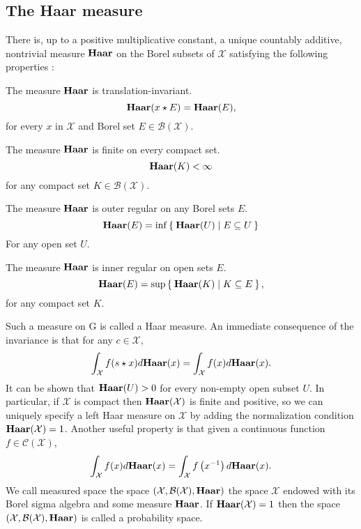 \subsection{The Haar measure}
\begin{definition}
There is, up to a positive multiplicative constant, a unique countably additive, nontrivial measure $\mathbf{Haar}$ on the Borel subsets of $\mathcal{X}$ satisfying the following properties :
\begin{propenum}
\item The measure $\mathbf{Haar}$ is translation-invariant.
\begin{dmath*}
\Haar(x\groupop E) = \Haar(E),
\end{dmath*}
for every $x$ in $\mathcal{X}$ and Borel set $E\in\mathcal{B}(\mathcal{X})$.
\item The measure $\mathbf{Haar}$ is finite on every compact set.
\begin{dmath*}
\Haar(K) < \infty
\end{dmath*}
for any compact set $K\in\mathcal{B}(\mathcal{X})$.
\item The measure $\mathbf{Haar}$ is outer regular on any Borel sets $E$.
\begin{dmath*}
\Haar(E)=\inf \Set{\Haar(U) | E\subseteq U}
\end{dmath*}
For any open set $U$.
\item The measure $\mathbf{Haar}$ is inner regular on open sets $E$.
\begin{dmath*}
\Haar(E)=\sup\Set{\Haar(K) | K\subseteq E},
\end{dmath*}
for any compact set $K$.
\end{propenum}
\end{definition}
Such a measure on G is called a Haar measure. An immediate consequence of the invariance is that for any $c\in\mathcal{X}$,
\begin{dmath*}
\int_{\mathcal{X}}f(s\groupop x)d\Haar(x)=\int_{\mathcal{X}}f(x)d\Haar(x).
\end{dmath*}
It can be shown that $\mathbf{Haar}(U) > 0$ for every non-empty open subset $U$. In particular, if $\mathcal{X}$ is compact then $\mathbf{Haar}(\mathcal{X})$ is finite and positive, so we can uniquely specify a left Haar measure on $\mathcal{X}$ by adding the normalization condition $\mathbf{Haar}(\mathcal{X})=1$. Another useful property is that given a continuous function $f\in\mathcal{C}(\mathcal{X})$,
\begin{dmath*}
\int_{\mathcal{X}}f(x)d\Haar(x)=\int_{\mathcal{X}}f\left(\inv{x}\right)d\Haar(x).
\end{dmath*}
We call measured space the space $(\mathcal{X},\mathcal{B}(\mathcal{X}),\mathbf{Haar})$ the space $\mathcal{X}$ endowed with its Borel sigma algebra and some measure $\mathbf{Haar}$. If $\mathbf{Haar}(\mathcal{X})=1$ then the space $(\mathcal{X},\mathcal{B}(\mathcal{X}),\mathbf{Haar})$ is called a probability space.
